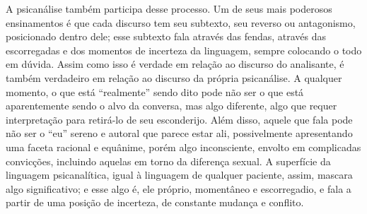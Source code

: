 A psicanálise também participa desse processo. Um de seus mais poderosos
ensinamentos é que cada discurso tem seu subtexto, seu reverso ou
antagonismo, posicionado dentro dele; esse subtexto fala através das
fendas, através das escorregadas e dos momentos de incerteza da
linguagem, sempre colocando o todo em dúvida. Assim como isso é verdade
em relação ao discurso do analisante, é também verdadeiro em relação ao
discurso da própria psicanálise. A qualquer momento, o que está
``realmente'' sendo dito pode não ser o que está aparentemente sendo o
alvo da conversa, mas algo diferente, algo que requer interpretação para
retirá-lo de seu esconderijo. Além disso, aquele que fala pode não ser o
``eu'' sereno e autoral que parece estar ali, possivelmente apresentando
uma faceta racional e equânime, porém algo inconsciente, envolto em
complicadas convicções, incluindo aquelas em torno da diferença sexual.
A superfície da linguagem psicanalítica, igual à linguagem de qualquer
paciente, assim, mascara algo significativo; e esse algo é, ele próprio,
momentâneo e escorregadio, e fala a partir de uma posição de incerteza,
de constante mudança e conflito.

